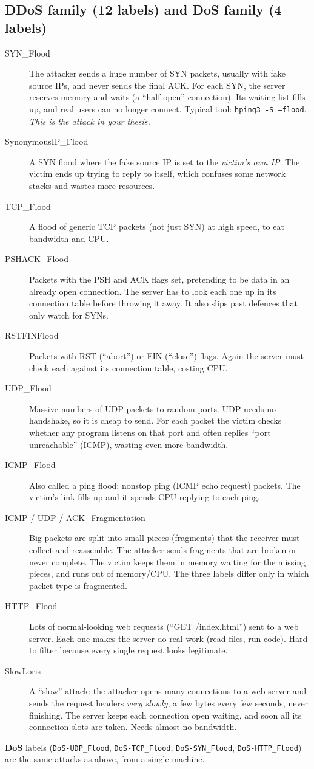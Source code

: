\documentclass[11pt]{article}
\begin{document}
\subsection*{DDoS family (12 labels) and DoS family (4 labels)}
\begin{description}
\item[SYN\_Flood] The attacker sends a huge number of SYN packets, usually with fake source IPs, and never sends the final ACK.
For each SYN, the server reserves memory and waits (a ``half-open'' connection). Its waiting list fills up, and real users can no longer connect.
Typical tool: \texttt{hping3 -S --flood}. \emph{This is the attack in your thesis.}
\item[SynonymousIP\_Flood] A SYN flood where the fake source IP is set to the \emph{victim's own IP}. The victim ends up trying to reply to itself, which confuses some network stacks and wastes more resources.
\item[TCP\_Flood] A flood of generic TCP packets (not just SYN) at high speed, to eat bandwidth and CPU.
\item[PSHACK\_Flood] Packets with the PSH and ACK flags set, pretending to be data in an already open connection. The server has to look each one up in its connection table before throwing it away. It also slips past defences that only watch for SYNs.
\item[RSTFINFlood] Packets with RST (``abort'') or FIN (``close'') flags. Again the server must check each against its connection table, costing CPU.
\item[UDP\_Flood] Massive numbers of UDP packets to random ports. UDP needs no handshake, so it is cheap to send. For each packet the victim checks whether any program listens on that port and often replies ``port unreachable'' (ICMP), wasting even more bandwidth.
\item[ICMP\_Flood] Also called a ping flood: nonstop ping (ICMP echo request) packets. The victim's link fills up and it spends CPU replying to each ping.
\item[ICMP / UDP / ACK\_Fragmentation] Big packets are split into small pieces (fragments) that the receiver must collect and reassemble. The attacker sends fragments that are broken or never complete. The victim keeps them in memory waiting for the missing pieces, and runs out of memory/CPU. The three labels differ only in which packet type is fragmented.
\item[HTTP\_Flood] Lots of normal-looking web requests (``GET /index.html'') sent to a web server. Each one makes the server do real work (read files, run code). Hard to filter because every single request looks legitimate.
\item[SlowLoris] A ``slow'' attack: the attacker opens many connections to a web server and sends the request headers \emph{very slowly}, a few bytes every few seconds, never finishing. The server keeps each connection open waiting, and soon all its connection slots are taken. Needs almost no bandwidth.
\end{description}
\textbf{DoS} labels (\texttt{DoS-UDP\_Flood}, \texttt{DoS-TCP\_Flood}, \texttt{DoS-SYN\_Flood}, \texttt{DoS-HTTP\_Flood}) are the same attacks as above, from a single machine.
\end{document}
